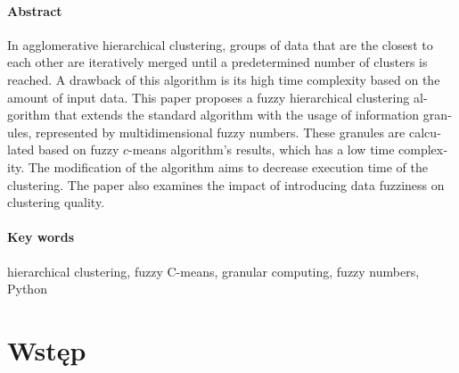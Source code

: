 \documentclass[a4paper,twoside,12pt]{book}
\newcounter{stronyPozaNumeracja}
\begin{document}
\subsubsection*{Abstract} 
\begin{otherlanguage}{british}
In agglomerative hierarchical clustering, groups of data that are the closest to each other are iteratively merged until a predetermined number of clusters is reached. A drawback of this algorithm is its high time complexity based on the amount of input data. This paper proposes a fuzzy hierarchical clustering algorithm that extends the standard algorithm with the usage of information granules, represented by multidimensional fuzzy numbers. These granules are calculated based on fuzzy $c$-means algorithm's results, which has a low time complexity. The modification of the algorithm aims to decrease execution time of the clustering. The paper also examines the impact of introducing data fuzziness on clustering quality.
\end{otherlanguage}
\subsubsection*{Key words}  
\begin{otherlanguage}{british}
hierarchical clustering, fuzzy C-means, granular computing, fuzzy numbers, Python
\end{otherlanguage}




\tableofcontents

\setcounter{stronyPozaNumeracja}{\value{page}}
\mainmatter
\pagestyle{empty}

\cleardoublepage

\pagestyle{NumeryStronNazwyRozdzialow}


\chapter{Wstęp}

\end{document}
